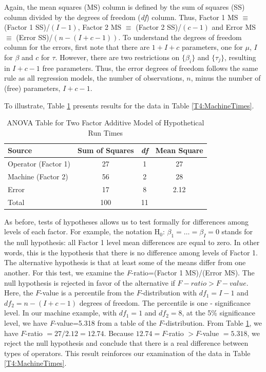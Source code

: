 Again, the mean squares (MS) column is defined by the sum of squares
(SS) column divided by the degrees of freedom (\textit{df}) column.
Thus, Factor 1 MS $\equiv $ (Factor 1 SS)/$(I-1)$, Factor 2 MS
$\equiv $ (Factor 2 SS)/$(c-1)$ and Error MS $\equiv $ (Error
SS)/$(n-(I+c-1))$. To understand the degrees of freedom column for
the errors, first note that there are $1+I+c$ parameters, one for
$\mu $, $I$ for $\beta $ and $c$ for $\tau $. However, there are two
restrictions on $\{\beta_i\}$ and $\{\tau_{j}\}$, resulting in
$I+c-1$ free parameters. Thus, the error degrees of freedom follows
the same rule as all regression models, the number of observations,
$n$, minus the number of (free) parameters, $I+c-1$.

To illustrate, Table \ref{T4:ANOVATwoFactor} presents results for
the data in Table \ref{T4:MachineTimes}.

  \begin{center}  \begin{table}[h]
\caption{\label{T4:ANOVATwoFactor} ANOVA Table for Two Factor
Additive Model of Hypothetical Run Times}

\begin{tabular}{lccc}
\hline Source & Sum of Squares & \textit{df} & Mean Square \\
\hline Operator (Factor 1) & 27  & 1  & 27 \\
Machine (Factor 2)         & 56  & 2  & 28 \\
Error                      & 17  & 8  & 2.12 \\
Total                      & 100 & 11 &  \\ \hline
\end{tabular}

\end{table}  \end{center}  

As before, tests of hypotheses allows us to test formally for
differences among levels of each factor. For example, the notation
H$_0$: $\beta_1=\ldots =\beta_I=0$ stands for the null hypothesis:
all Factor 1 level mean differences are equal to zero. In other
words, this is the hypothesis that there is no difference among
levels of Factor 1. The alternative hypothesis is that at least some
of the means differ from one another. For this test, we examine the
\textit{F}-ratio=(Factor 1 MS)/(Error MS). The null hypothesis is
rejected in favor of the alternative if $F-ratio>F-value. $ Here,
the $F$-value is a percentile from the $F$-distribution with
$df_1=I-1$ and $df_2=n-(I+c-1)$ degrees of freedom. The percentile
is one - significance level. In our machine example, with $df_1=1$
and $df_2=8$, at the 5\% significance level, we have
\textit{F}-value=5.318 from a table of the $F$-distribution. From
Table \ref{T4:ANOVATwoFactor}, we have $\mathit{F}$-ratio
$=27/2.12=12.74$. Because $12.74=F$-ratio $>F$-value $=5.318$, we
reject the null hypothesis and conclude that there is a real
difference between types of operators. This result reinforces our
examination of the data in Table \ref{T4:MachineTimes}.

